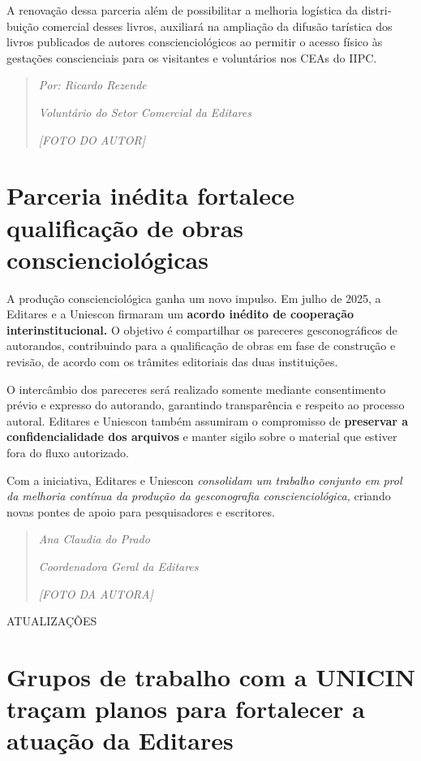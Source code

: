 \documentclass[
]{article}
\begin{document}
A renovação dessa parceria além de possibilitar a melhoria logística da distri­buição comercial desses livros, auxiliará na ampliação da difusão tarística dos livros pu­blicados de autores conscienciológicos ao permitir o acesso físico às gestações conscien­ciais para os visitantes e voluntários nos CEAs do IIPC.

\begin{quote}
\emph{Por: Ricardo Rezende}

\emph{Voluntário do Setor Comercial da Editares}

\emph{{[}FOTO DO AUTOR{]}}
\end{quote}

\section{\texorpdfstring{ Parceria inédita fortalece qualificação de obras conscienciológicas}{ Parceria inédita fortalece qualificação de obras conscienciológicas}}\label{parceria-inuxe9dita-fortalece-qualificauxe7uxe3o-de-obras-consciencioluxf3gicas}

A produção conscienciológica ganha um novo impulso. Em julho de 2025, a Editares e a Uniescon firmaram um \textbf{acordo inédito de cooperação interinstitucional.} O objetivo é compartilhar os pareceres gesconográficos de autorandos, contribuindo para a qualificação de obras em fase de construção e revisão, de acordo com os trâmites editoriais das duas instituições.

O intercâmbio dos pareceres será realizado somente mediante consentimento prévio e expresso do autorando, garantindo transparência e respeito ao processo autoral. Editares e Uniescon também assumiram o compromisso de \textbf{preservar a confidencialidade dos arquivos} e manter sigilo sobre o material que estiver fora do fluxo autorizado.

Com a iniciativa, Editares e Uniescon \emph{consolidam um trabalho conjunto em prol da melhoria contínua da produção da gesconografia conscienciológica,} criando novas pontes de apoio para pesquisadores e escritores.

\begin{quote}
\emph{Ana Claudia do Prado}

\emph{Coordenadora Geral da Editares}

\emph{{[}FOTO DA AUTORA{]}}
\end{quote}

ATUALIZAÇÕES

\section{Grupos de trabalho com a UNICIN traçam planos para fortalecer a atuação da Editares}\label{grupos-de-trabalho-com-a-unicin-trauxe7am-planos-para-fortalecer-a-atuauxe7uxe3o-da-editares}
\end{document}
